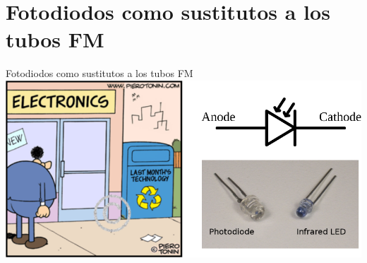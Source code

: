 \documentclass[a4paper,10pt]{beamer}
\begin{document}
\section{Fotodiodos como sustitutos a los tubos FM}
\begin{frame}
\begin{center}
 {\Huge{\color{blue}Fotodiodos como sustitutos a los tubos FM}} \\
 \vspace{0.5cm}
 \includegraphics[scale=0.35]{fig35}
\end{center}
\end{frame}
\end{document}
